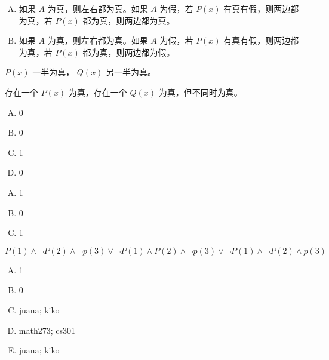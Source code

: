 {{        %
        \begin{practices}
            \begin{enumerate}[A.]
                \item 如果 $A$ 为真，则左右都为真。如果 $A$ 为假，若 $P(x)$ 有真有假，则两边都为真，若 $P(x)$ 都为真，则两边都为真。
                \item 如果 $A$ 为真，则左右都为真。如果 $A$ 为假，若 $P(x)$ 有真有假，则两边都为真，若 $P(x)$ 都为真，则两边都为假。
            \end{enumerate}
        \end{practices}

        \begin{practices}
            $P(x)$ 一半为真， $Q(x)$ 另一半为真。
        \end{practices}

        \begin{practices}
            存在一个 $P(x)$ 为真，存在一个 $Q(x)$ 为真，但不同时为真。
        \end{practices}

        \begin{practices}
            \begin{enumerate}[A.]
                \item 0
                \item 0
                \item 1
                \item 0
            \end{enumerate}
        \end{practices}

        \begin{practices}
            \begin{enumerate}[A.]
                \item 1
                \item 0
                \item 1
            \end{enumerate}
        \end{practices}

        \begin{practices}
            $P(1) \wedge \neg P(2) \wedge \neg p(3) \vee \neg P(1) \wedge P(2) \wedge \neg p(3) \vee \neg P(1) \wedge \neg P(2) \wedge p(3)$
        \end{practices}

        \begin{practices}
            \begin{enumerate}[A.]
                \item 1
                \item 0
                \item juana; kiko
                \item math273; cs301
                \item juana; kiko
            \end{enumerate}
        \end{practices}

}}
